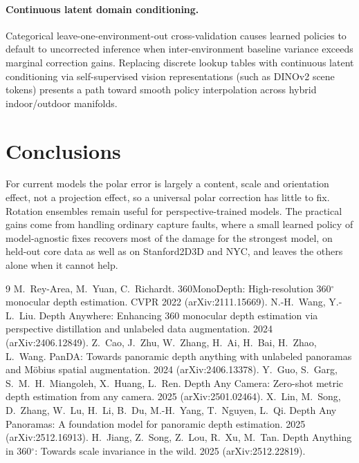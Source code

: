 \documentclass{article}
\begin{document}
\paragraph{Continuous latent domain conditioning.} Categorical leave-one-environment-out cross-validation causes learned policies to default to uncorrected inference when inter-environment baseline variance exceeds marginal correction gains. Replacing discrete lookup tables with continuous latent conditioning via self-supervised vision representations (such as DINOv2 scene tokens) presents a path toward smooth policy interpolation across hybrid indoor/outdoor manifolds.

\section{Conclusions}
For current models the polar error is largely a content, scale and orientation effect, not a projection effect, so a universal polar correction has little to fix. Rotation ensembles remain useful for perspective-trained models. The practical gains come from handling ordinary capture faults, where a small learned policy of model-agnostic fixes recovers most of the damage for the strongest model, on held-out core data as well as on Stanford2D3D and NYC, and leaves the others alone when it cannot help.

\begin{thebibliography}{9}
 M.~Rey-Area, M.~Yuan, C.~Richardt. 360MonoDepth: High-resolution 360$^\circ$ monocular depth estimation. CVPR 2022 (arXiv:2111.15669).
 N.-H.~Wang, Y.-L.~Liu. Depth Anywhere: Enhancing 360 monocular depth estimation via perspective distillation and unlabeled data augmentation. 2024 (arXiv:2406.12849).
 Z.~Cao, J.~Zhu, W.~Zhang, H.~Ai, H.~Bai, H.~Zhao, L.~Wang. PanDA: Towards panoramic depth anything with unlabeled panoramas and M\"obius spatial augmentation. 2024 (arXiv:2406.13378).
 Y.~Guo, S.~Garg, S.~M.~H.~Miangoleh, X.~Huang, L.~Ren. Depth Any Camera: Zero-shot metric depth estimation from any camera. 2025 (arXiv:2501.02464).
 X.~Lin, M.~Song, D.~Zhang, W.~Lu, H.~Li, B.~Du, M.-H.~Yang, T.~Nguyen, L.~Qi. Depth Any Panoramas: A foundation model for panoramic depth estimation. 2025 (arXiv:2512.16913).
 H.~Jiang, Z.~Song, Z.~Lou, R.~Xu, M.~Tan. Depth Anything in 360$^\circ$: Towards scale invariance in the wild. 2025 (arXiv:2512.22819).
\end{thebibliography}
\end{document}
